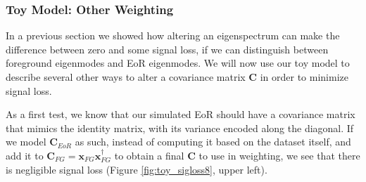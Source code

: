 \documentclass[preprint2,numberedappendix,tighten,twocolappendix]{aastex6}  %
\begin{document}
\subsubsection{Toy Model: Other Weighting}

In a previous section we showed how altering an eigenspectrum can make the difference between zero and some signal loss, if we can distinguish between foreground eigenmodes and EoR eigenmodes. We will now use our toy model to describe several other ways to alter a covariance matrix $\textbf{C}$ in order to minimize signal loss. 

As a first test, we know that our simulated EoR should have a covariance matrix that mimics the identity matrix, with its variance encoded along the diagonal. If we model $\textbf{C}_{EoR}$ as such, instead of computing it based on the dataset itself, and add it to $\textbf{C}_{FG} = \textbf{x}_{FG}\textbf{x}_{FG}^{\dagger}$ to obtain a final $\textbf{C}$ to use in weighting, we see that there is negligible signal loss (Figure \ref{fig:toy_sigloss8}, upper left).
\end{document}
